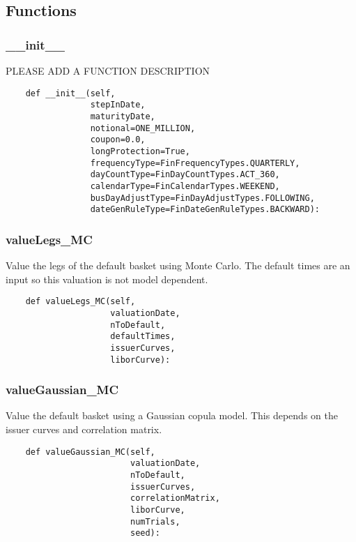 \documentclass[twoside,11pt]{book}
\begin{document}
\subsection*{Functions}

\subsubsection*{{\bf \_\_init\_\_}}
PLEASE ADD A FUNCTION DESCRIPTION

\begin{lstlisting}
    def __init__(self,
                 stepInDate,
                 maturityDate,
                 notional=ONE_MILLION,
                 coupon=0.0,
                 longProtection=True,
                 frequencyType=FinFrequencyTypes.QUARTERLY,
                 dayCountType=FinDayCountTypes.ACT_360,
                 calendarType=FinCalendarTypes.WEEKEND,
                 busDayAdjustType=FinDayAdjustTypes.FOLLOWING,
                 dateGenRuleType=FinDateGenRuleTypes.BACKWARD):
\end{lstlisting}

\subsubsection*{{\bf valueLegs\_MC}}
Value the legs of the default basket using Monte Carlo. The default times are an input so this valuation is not model dependent.  

\begin{lstlisting}
    def valueLegs_MC(self,
                     valuationDate,
                     nToDefault,
                     defaultTimes,
                     issuerCurves,
                     liborCurve):
\end{lstlisting}

\subsubsection*{{\bf valueGaussian\_MC}}
Value the default basket using a Gaussian copula model. This  depends on the issuer curves and correlation matrix.  

\begin{lstlisting}
    def valueGaussian_MC(self,
                         valuationDate,
                         nToDefault,
                         issuerCurves,
                         correlationMatrix,
                         liborCurve,
                         numTrials,
                         seed):
\end{lstlisting}
\end{document}
